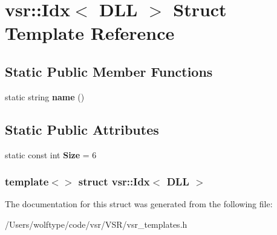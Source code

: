 \hypertarget{structvsr_1_1_idx_3_01_d_l_l_01_4}{\section{vsr\-:\-:Idx$<$ D\-L\-L $>$ Struct Template Reference}
\label{structvsr_1_1_idx_3_01_d_l_l_01_4}
}
\subsection*{Static Public Member Functions}
\begin{DoxyCompactItemize}
\item 
\hypertarget{structvsr_1_1_idx_3_01_d_l_l_01_4_a0b141c065e91f7f8b35fd1308baccf74}{static string {\bfseries name} ()}\label{structvsr_1_1_idx_3_01_d_l_l_01_4_a0b141c065e91f7f8b35fd1308baccf74}

\end{DoxyCompactItemize}
\subsection*{Static Public Attributes}
\begin{DoxyCompactItemize}
\item 
\hypertarget{structvsr_1_1_idx_3_01_d_l_l_01_4_a7d4088a4e1dc74f5925e19ee1b9d55b6}{static const int {\bfseries Size} = 6}\label{structvsr_1_1_idx_3_01_d_l_l_01_4_a7d4088a4e1dc74f5925e19ee1b9d55b6}

\end{DoxyCompactItemize}
\subsubsection*{template$<$$>$ struct vsr\-::\-Idx$<$ D\-L\-L $>$}



The documentation for this struct was generated from the following file\-:\begin{DoxyCompactItemize}
\item 
/\-Users/wolftype/code/vsr/\-V\-S\-R/vsr\-\_\-templates.\-h\end{DoxyCompactItemize}
